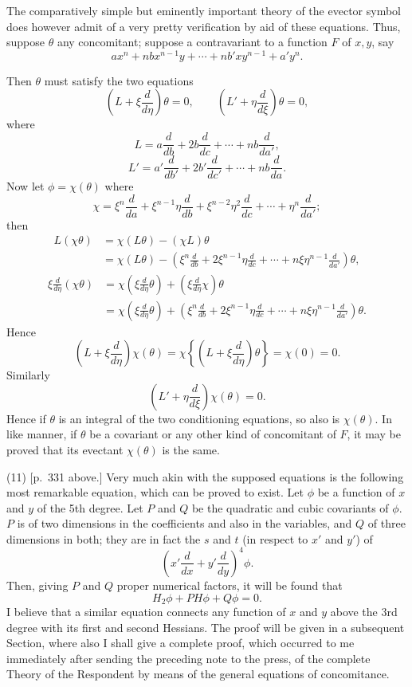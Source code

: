 \documentclass[11pt]{article}
\newcommand{\sourcepage}[1]{\marginpar{\scriptsize p.~#1}}
\begin{document}
The comparatively simple but eminently important theory of the evector symbol does however admit of a very pretty verification by aid of these equations. Thus, suppose $\theta$ any concomitant; suppose a contravariant to a function $F$ of $x,y$, say
\[
ax^n+nbx^{n-1}y+\cdots+nb'xy^{n-1}+a'y^n.
\]

\sourcepage{362}
Then $\theta$ must satisfy the two equations
\[
\left(L+\xi\frac{d}{d\eta}\right)\theta=0,
\qquad
\left(L'+\eta\frac{d}{d\xi}\right)\theta=0,
\]
where
\[
L=a\frac{d}{db}+2b\frac{d}{dc}+\cdots+nb\frac{d}{da'},
\]
\[
L'=a'\frac{d}{db'}+2b'\frac{d}{dc'}+\cdots+nb\frac{d}{da}.
\]
Now let $\phi=\chi(\theta)$ where
\[
\chi=\xi^n\frac{d}{da}+\xi^{n-1}\eta\frac{d}{db}+\xi^{n-2}\eta^2\frac{d}{dc}+\cdots+\eta^n\frac{d}{da'};
\]
then
\[
\begin{aligned}
L(\chi\theta)&=\chi(L\theta)-(\chi L)\theta\\
&=\chi(L\theta)-\left(\xi^n\frac{d}{db}+2\xi^{n-1}\eta\frac{d}{dc}+\cdots+n\xi\eta^{n-1}\frac{d}{da'}\right)\theta,
\end{aligned}
\]
\[
\begin{aligned}
\xi\frac{d}{d\eta}(\chi\theta)&=\chi\left(\xi\frac{d}{d\eta}\theta\right)+\left(\xi\frac{d}{d\eta}\chi\right)\theta\\
&=\chi\left(\xi\frac{d}{d\eta}\theta\right)+
\left(\xi^n\frac{d}{db}+2\xi^{n-1}\eta\frac{d}{dc}+\cdots+n\xi\eta^{n-1}\frac{d}{da'}\right)\theta.
\end{aligned}
\]
Hence
\[
\left(L+\xi\frac{d}{d\eta}\right)\chi(\theta)=
\chi\left\{\left(L+\xi\frac{d}{d\eta}\right)\theta\right\}=\chi(0)=0.
\]
Similarly
\[
\left(L'+\eta\frac{d}{d\xi}\right)\chi(\theta)=0.
\]
Hence if $\theta$ is an integral of the two conditioning equations, so also is $\chi(\theta)$. In like manner, if $\theta$ be a covariant or any other kind of concomitant of $F$, it may be proved that its evectant $\chi(\theta)$ is the same.

(11) [p.~331 above.] Very much akin with the supposed equations is the following most remarkable equation, which can be proved to exist. Let $\phi$ be a function of $x$ and $y$ of the 5th degree. Let $P$ and $Q$ be the quadratic and cubic covariants of $\phi$. $P$ is of two dimensions in the coefficients and also in the variables, and $Q$ of three dimensions in both; they are in fact the $s$ and $t$ (in respect to $x'$ and $y'$) of
\[
\left(x'\frac{d}{dx}+y'\frac{d}{dy}\right)^4\phi.
\]
Then, giving $P$ and $Q$ proper numerical factors, it will be found that
\[
H_2\phi+PH\phi+Q\phi=0.
\]
I believe that a similar equation connects any function of $x$ and $y$ above the 3rd degree with its first and second Hessians. The proof will be given in a subsequent Section, where also I shall give a complete proof, which occurred to me immediately after sending the preceding note to the press, of the complete Theory of the Respondent by means of the general equations of concomitance.
\end{document}
